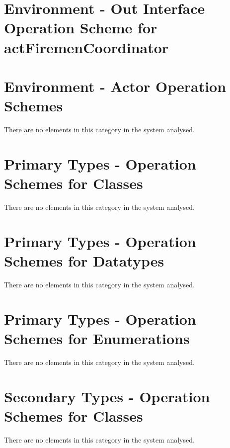 \section{Environment - Out Interface Operation Scheme for actFiremenCoordinator}
\label{OM-EM-OutInterface-OS-actFiremenCoordinator}



\section{Environment - Actor Operation Schemes}
There are no elements in this category in the system analysed.
		


\section{Primary Types - Operation Schemes for Classes}
There are no elements in this category in the system analysed.




\section{Primary Types - Operation Schemes for Datatypes}
There are no elements in this category in the system analysed.




\section{Primary Types - Operation Schemes for Enumerations}
There are no elements in this category in the system analysed.







\section{Secondary Types - Operation Schemes for Classes}
There are no elements in this category in the system analysed.




